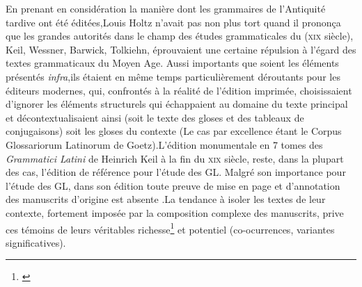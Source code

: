 \documentclass[a4paper, twoside, 12pt]{book}
\begin{document}
En prenant en considération la manière dont les grammaires de l'Antiquité tardive ont été éditées,Louis Holtz n'avait pas non plus tort quand il prononça que les grandes autorités dans le champ des études grammaticales du (\textsc{xix}\ieme{} siècle), Keil, Wessner, Barwick, Tolkiehn, éprouvaient  une certaine répulsion à l'égard des textes grammaticaux du Moyen Age. Aussi importants que soient les éléments présentés \textit{infra},ils étaient en même temps particulièrement déroutants pour les éditeurs modernes, qui, confrontés à la réalité de l'édition imprimée, choisissaient d'ignorer les éléments structurels qui échappaient au domaine du texte principal et décontextualisaient ainsi (soit le texte des gloses et des tableaux de conjugaisons) soit les gloses du contexte (Le cas par excellence étant le Corpus Glossariorum Latinorum de Goetz).L’édition monumentale en 7 tomes des \textit{Grammatici Latini} de Heinrich Keil à la fin du \textsc{xix}\ieme{} siècle, reste, dans la plupart des cas, l’édition de référence  pour l’étude des GL. Malgré son importance pour l'étude des GL, dans  son édition toute preuve de mise en page et d’annotation des manuscrits d’origine est absente .La tendance à isoler les textes de leur contexte, fortement imposée par la composition complexe des manuscrits, prive ces témoins de leurs véritables richesse\footnote{\cite{pierazzo2011putting}} et potentiel (co-ocurrences, variantes significatives).\\
\end{document}
